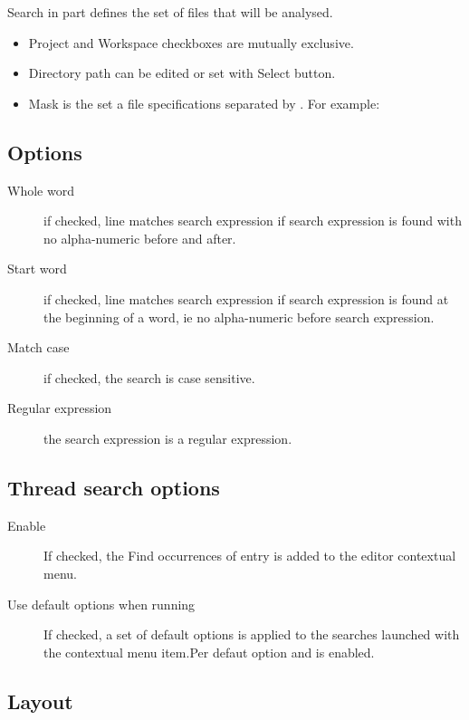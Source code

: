 Search in part defines the set of files that will be analysed.

\begin{itemize}
\item Project and Workspace checkboxes are mutually exclusive.
\item Directory path can be edited or set with Select button.
\item Mask is the set a file specifications separated by \samp{;}. For example: 
\end{itemize}

\subsection{Options}

\begin{description}
\item[Whole word] if checked, line matches search expression if search expression is found with no alpha-numeric  before and after.
\item[Start word] if checked, line matches search expression if search expression is found at the beginning of a word, ie no alpha-numeric  before search expression.
\item[Match case] if checked, the search is case sensitive.
\item[Regular expression] the search expression is a regular expression.
\end{description}

\subsection{Thread search options}

\begin{description}
\item[Enable ] If checked, the Find occurrences of  entry is added to the editor contextual menu.
\item[Use default options when running ] If checked, a set of default options is applied to the searches launched with the  contextual menu item.Per defaut option  and  is enabled.
\end{description}

\subsection{Layout}

